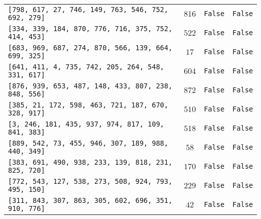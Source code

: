 \documentclass[12pt]{scrartcl}
\begin{document}
\begin{table}[H]
{\begin{tabular}{lccc}
        \texttt{[798, 617, 27,  746, 149, 763, 546, 752, 692, 279]} & ${816}$  & \texttt{False} & \texttt{False} \\
        \texttt{[334, 339, 184, 870, 776, 716, 375, 752, 414, 453]} & ${522}$  & \texttt{False} & \texttt{False} \\
        \texttt{[683, 969, 687, 274, 870, 566, 139, 664, 699, 325]} & ${17}$   & \texttt{False} & \texttt{False} \\
        \texttt{[641, 411, 4,   735, 742, 205, 264, 548, 331, 617]} & ${604}$  & \texttt{False} & \texttt{False} \\
        \texttt{[876, 939, 653, 487, 148, 433, 807, 238, 848, 556]} & ${872}$  & \texttt{False} & \texttt{False} \\
        \texttt{[385, 21,  172, 598, 463, 721, 187, 670, 328, 917]} & ${510}$  & \texttt{False} & \texttt{False} \\
        \texttt{[3,   246, 181, 435, 937, 974, 817, 109, 841, 383]} & ${518}$  & \texttt{False} & \texttt{False} \\
        \texttt{[889, 542, 73,  455, 946, 307, 189, 988, 440, 349]} & ${58}$   & \texttt{False} & \texttt{False} \\
        \texttt{[383, 691, 490, 938, 233, 139, 818, 231, 825, 720]} & ${170}$  & \texttt{False} & \texttt{False} \\
        \texttt{[772, 543, 127, 538, 273, 508, 924, 793, 495, 150]} & ${229}$  & \texttt{False} & \texttt{False} \\
        \texttt{[311, 843, 307, 863, 305, 602, 696, 351, 910, 776]} & ${42}$   & \texttt{False} & \texttt{False} \\
    \end{tabular}
    }
\end{table}
\end{document}
